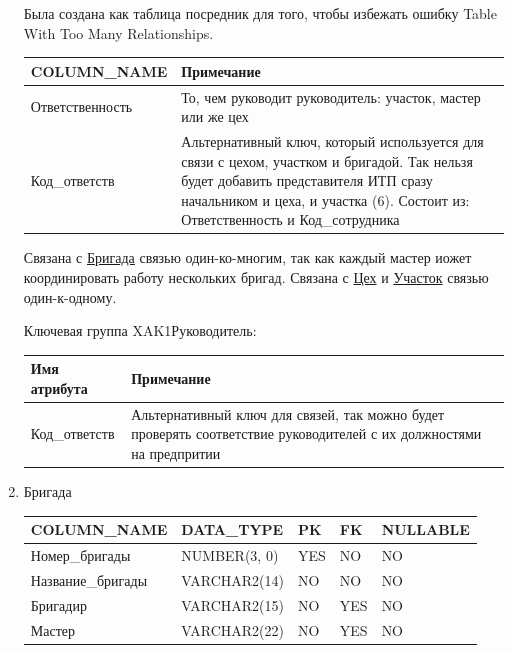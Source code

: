\begin{enumerate}
\begin{tabular}{|p{7cm}|p{3cm}|p{1cm}|p{1cm}|p{3cm}|}
    \end{tabular}

    Была создана как таблица посредник для того, чтобы избежать ошибку Table With Too Many Relationships.

    \begin{tabular}{|p{7cm}|p{9.3cm}|} \hline

        {\bf COLUMN\_NAME} & {\bf Примечание} \\ \hline
        Ответственность & То, чем руководит руководитель: участок, мастер или же цех  \\ \hline
        Код\_ответств & Альтернативный ключ, который используется для связи с цехом, участком и бригадой. Так нельзя будет добавить представителя ИТП сразу начальником и цеха, и участка (6). Состоит из: Ответственность и Код\_сотрудника \\ \hline
    \end{tabular}

    Связана с \underline{Бригада} связью один-ко-многим, так как каждый мастер иожет координировать работу нескольких бригад.
    Связана с \underline{Цех} и \underline{Участок} связью один-к-одному.

    Ключевая группа XAK1Руководитель:

    \begin{tabular}{|p{7cm}|p{9.3cm}|} \hline

        {\bf Имя атрибута} & {\bf Примечание} \\ \hline
        Код\_ответств & Альтернативный ключ для связей, так можно будет проверять соответствие руководителей с их должностями на предпритии \\ \hline

    \end{tabular}

    \item{Бригада}

    \begin{tabular}{|p{7cm}|p{3cm}|p{1cm}|p{1cm}|p{3cm}|} \hline

        {\bf COLUMN\_NAME} & {\bf DATA\_TYPE} & {\bf PK} & {\bf FK} & {\bf NULLABLE} \\ \hline
        Номер\_бригады & NUMBER(3, 0) & YES & NO & NO \\ \hline
        Название\_бригады & VARCHAR2(14) & NO & NO & NO \\ \hline
        Бригадир & VARCHAR2(15) & NO & YES & NO \\ \hline
        Мастер & VARCHAR2(22) & NO & YES & NO \\ \hline


\end{tabular}
\end{enumerate}
